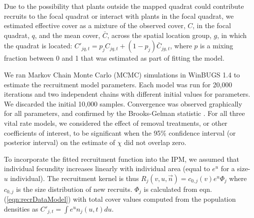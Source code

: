 \documentclass[11pt]{article}
\begin{document}
Due to the possibility that plants outside the mapped quadrat could contribute recruits to the focal quadrat or interact with plants in the focal quadrat, we estimated effective cover as a mixture of the observed cover, $C$, in the focal quadrat, $q$, and the mean cover, $\bar{C}$, across the spatial location group, $g$, in which the 
quadrat is located: $C'_{jq,t}=p_j C_{jq,t}+(1-p_j) \bar{C}_{jg,t}$, where $p$ is a mixing fraction between 0 and 1 that was estimated as part of fitting the model.

We ran Markov Chain Monte Carlo (MCMC) simulations in WinBUGS 1.4 \citep{lunn_winbugs_2000} to estimate the recruitment model parameters. Each model was run for 20,000 iterations and two independent chains with different initial values for parameters. We discarded the initial 10,000 samples. Convergence was observed graphically for all parameters, and confirmed by the Brooks-Gelman statistic \citep{brooks_general_1998}. For all three vital rate models, we considered the effect of removal treatments, or other coefficients of interest, to be significant when the 95\% confidence interval (or posterior interval) on the estimate of $\chi$ did not overlap zero.  

To incorporate the fitted recruitment function into the IPM, we assumed that individual fecundity increases 
linearly with individual area (equal to $e^u$ for a size-$u$ individual). The recruitment kernel is thus
$R_j(v,u,\vec{n})=c_{0,j}(v)e^{u}\Phi_j$ \citep{adler_coexistence_2010} where $c_{0,j}$ is the
size distribution of new recruits. $\Phi_j$ is calculated from eqn. (\ref{eqn:recrDataModel}) with total cover values computed from the population densities as $C'_{j,t} = \int e^u n_j(u,t) du$. 
\end{document}
